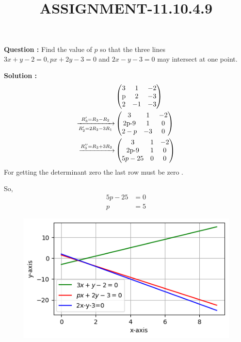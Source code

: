 \documentclass[12pt]{article}
\providecommand{\myvec}[1]{\ensuremath{\begin{pmatrix}#1\end{pmatrix}}}
\begin{document}
\title{\textbf{ASSIGNMENT-11.10.4.9}}
\date{}
\maketitle
\textbf{Question :} Find the value of $p$ so that the three lines $3x+y-2=0,px+2y-3=0$ and $2x-y-3=0$ may intersect at one point.


\textbf{Solution :}
\begin{align}  
&\myvec{
    3 &1&-2 \\
     $p$&2&-3\\
     2&-1&-3
}\\
\xrightarrow[R_2'=2R_2-3R_1]{R_3'=R_3-R_2}&\myvec{
    3&1&-2\\
     $2p-9$&1&0\\
     2-p&-3&0}\\
 \xrightarrow{R_3''=R_3+3R_2}&\myvec{
    3&1&-2\\
     $2p-9$&1&0\\
     5p-25&0&0}\\
\end{align}
For getting the determinant zero the last row must be zero .

So,
\begin{align}
    5p-25&=0\\
    p&=5
\end{align}

\begin{figure}
    \centering
    \includegraphics[width=\columnwidth]{fig/11.10.4.9.png}
    \caption{}
    \label{11.10.4.9}
\end{figure}
\end{document}
